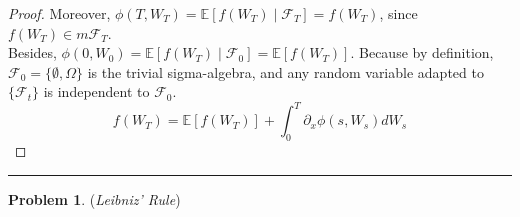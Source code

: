 \documentclass[a4paper, 10pt]{article}
\theoremstyle{definition}
\newtheorem{problem}{Problem}
\theoremstyle{hSol}
\begin{document}
\begin{proof}
Moreover, $\phi(T,W_T) = \mathbb{E}\left[f(W_T)\middle|\mathcal{F}_T\right] = f(W_T)$, since $f(W_T)\in m \mathcal{F}_T$. \\
Besides, $\phi(0,W_0) = \mathbb{E}\left[f(W_T)\middle|\mathcal{F}_0\right] = \mathbb{E}\left[f(W_T)\right]$. Because by definition, $\mathcal{F}_0 = \{\emptyset, \Omega\}$ is the trivial sigma-algebra, and any random variable adapted to $\{\mathcal{F}_t\}$ is independent to $\mathcal{F}_0$.  
\begin{equation}
	f(W_T) = \mathbb{E}\left[f(W_T)\right]+ \int_0^T \partial_x\phi(s,W_s)dW_s
\end{equation}
\end{proof}

\noindent\rule{16cm}{0.4pt}
\begin{problem} (\textit{Leibniz' Rule})
\end{problem}
\end{document}
